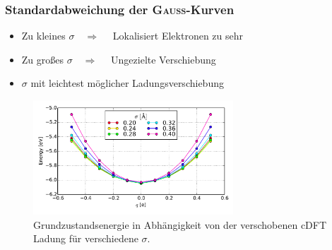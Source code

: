 \begin{frame}
\frametitle{Standardabweichung der \textsc{Gauß}-Kurven}
\begin{itemize}
\item Zu kleines $\sigma\quad\Rightarrow\quad$ Lokalisiert Elektronen zu sehr
\item Zu großes $\sigma\quad\Rightarrow\quad$ Ungezielte Verschiebung
\item $\sigma$ mit leichtest möglicher Ladungsverschiebung
\end{itemize}
\begin{figure}[!t]
	\centering
	\includegraphics[width = 7.5cm]{Images/Hydrogen/charging/gaussian_sigmas}
	\caption{Grundzustandsenergie in Abhängigkeit von der verschobenen cDFT Ladung für verschiedene $\sigma$.}
	\label{image_gaussian_sigmas_hydrogen}
\end{figure}
\end{frame}

